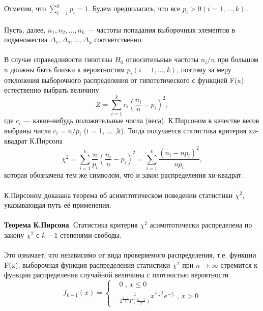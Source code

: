 \documentclass[../body.tex]{subfiles}
\begin{document}
	\\\\
	Отметим, что $\sum_{i=1}^{k}{p_{i}} = 1$.
	Будем предполагать, что все $p_{i} > 0 (i = 1, ... ,k).$
	\\\\
	Пусть, далее, $n_{1},n_{2}, ... ,n_{k}$ — частоты попадания выборочных элементов в подмножества $\Delta_{1},\Delta_{2}, ... ,\Delta_{k}$ соответственно.
	\\\\
	В случае справедливости гипотезы $H_{0}$ относительные частоты $n_{i}/n$ при большом n должны быть близки к вероятностям $p_{i} (i = 1, ... ,k)$, поэтому за меру отклонения выборочного распределения от гипотетического с функцией F(x) естественно выбрать величину
	\begin{equation}
		Z = \sum_{i = 1}^{k}{c_{i}(\frac{n_{i}}{n} - p_{i})^{2}}, 
		\label{Z}
	\end{equation}
	где $c_{i}$ — какие-нибудь положительные числа (веса). К.Пирсоном в качестве весов выбраны числа $c_{i} = n/p_{i}$ (i = 1, ... ,k). Тогда получается статистика критерия хи-квадрат К.Пирсона
	\begin{equation}
		\chi^{2} = \sum_{i = 1}^{k}{\frac{n}{p_{i}}(\frac{n_{i}}{n} - p_{i})^{2}} = \sum_{i = 1}^{k}{\frac{(n_{i} - np_{i})^{2}}{np_{i}}}, 
		\label{chi_2}
	\end{equation}
	которая обозначена тем же символом, что и закон распределения хи-квадрат.
	\\\\
	К.Пирсоном доказана теорема об асимптотическом поведении статистики $\chi^{2}$, указывающая путь её применения.
	\\\\
	\textbf{Теорема К.Пирсона}. Статистика критерия $\chi^{2}$ асимптотически распределена по закону $\chi^{2}$ с $k-1$ степенями свободы.
	\\\\
	Это означает, что независимо от вида проверяемого распределения, т.е. функции F(x), выборочная функция распределения статистики $\chi^{2}$ при $n \rightarrow \infty$  стремится к функции распределения случайной величины с плотностью вероятности 
	\begin{equation}
		f_{k - 1}(x) = 
		\begin{cases}
			& 0 \text{ , } x  \leq 0  \\ 
			& \frac{1}{2^{\frac{k-1}{2}}\Gamma(\frac{k-1}{2})}x^{\frac{k-3}{2}}e^{-\frac{x}{2}}
			\text{ , } x>0 
		\end{cases}
		\label{f_k-1}
	\end{equation}
\end{document}
